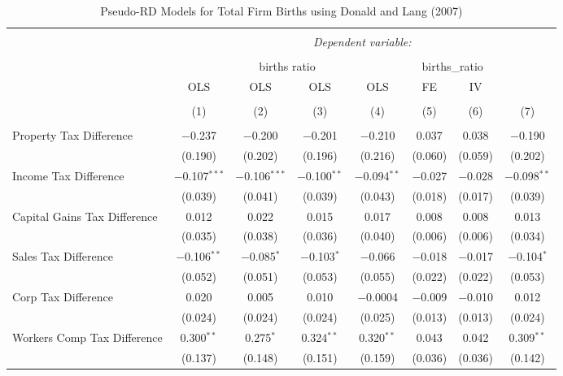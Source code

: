 
\begin{table}[!htbp] \centering 
  \caption{Pseudo-RD Models for  Total Firm Births using Donald and Lang (2007)} 
  \label{} 
\begin{tabular}{@{\extracolsep{5pt}}lccccccc} 
\\[-1.8ex]\hline 
\hline \\[-1.8ex] 
 & \multicolumn{7}{c}{\textit{Dependent variable:}} \\ 
\cline{2-8} 
\\[-1.8ex] & \multicolumn{4}{c}{births ratio} & \multicolumn{2}{c}{births\_ratio} &   \\ 
 & OLS & OLS & OLS & OLS & FE & IV &  \\ 
\\[-1.8ex] & (1) & (2) & (3) & (4) & (5) & (6) & (7)\\ 
\hline \\[-1.8ex] 
 Property Tax Difference & $-$0.237 & $-$0.200 & $-$0.201 & $-$0.210 & 0.037 & 0.038 & $-$0.190 \\ 
  & (0.190) & (0.202) & (0.196) & (0.216) & (0.060) & (0.059) & (0.202) \\ 
  Income Tax Difference & $-$0.107$^{***}$ & $-$0.106$^{***}$ & $-$0.100$^{**}$ & $-$0.094$^{**}$ & $-$0.027 & $-$0.028 & $-$0.098$^{**}$ \\ 
  & (0.039) & (0.041) & (0.039) & (0.043) & (0.018) & (0.017) & (0.039) \\ 
  Capital Gains Tax Difference & 0.012 & 0.022 & 0.015 & 0.017 & 0.008 & 0.008 & 0.013 \\ 
  & (0.035) & (0.038) & (0.036) & (0.040) & (0.006) & (0.006) & (0.034) \\ 
  Sales Tax Difference & $-$0.106$^{**}$ & $-$0.085$^{*}$ & $-$0.103$^{*}$ & $-$0.066 & $-$0.018 & $-$0.017 & $-$0.104$^{*}$ \\ 
  & (0.052) & (0.051) & (0.053) & (0.055) & (0.022) & (0.022) & (0.053) \\ 
  Corp Tax Difference & 0.020 & 0.005 & 0.010 & $-$0.0004 & $-$0.009 & $-$0.010 & 0.012 \\ 
  & (0.024) & (0.024) & (0.024) & (0.025) & (0.013) & (0.013) & (0.024) \\ 
  Workers Comp Tax Difference & 0.300$^{**}$ & 0.275$^{*}$ & 0.324$^{**}$ & 0.320$^{**}$ & 0.043 & 0.042 & 0.309$^{**}$ \\ 
  & (0.137) & (0.148) & (0.151) & (0.159) & (0.036) & (0.036) & (0.142) \\ 

\end{tabular}
\end{table}
